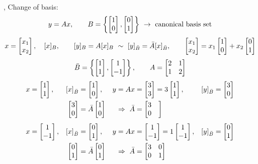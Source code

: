 \sep
\point Change of basis:
\[
y=Ax,\qquad B=\left\{\begin{bmatrix}1\\0\end{bmatrix},\begin{bmatrix}0\\1\end{bmatrix}\right\}\ \to\ \text{canonical basis set}
\]
\[
x=\begin{bmatrix}x_1\\x_2\end{bmatrix},\quad [x]_B,\qquad [y]_B=A[x]_B\ \sim\ [y]_{\bar{B}}=\bar{A}[x]_{\bar{B}},
\qquad
\begin{bmatrix}x_1\\x_2\end{bmatrix}=x_1\begin{bmatrix}1\\0\end{bmatrix}+x_2\begin{bmatrix}0\\1\end{bmatrix}
\]
\[
\bar{B}=\left\{\begin{bmatrix}1\\1\end{bmatrix},\begin{bmatrix}1\\-1\end{bmatrix}\right\},\qquad A=\begin{bmatrix}2&1\\1&2\end{bmatrix}
\]
\begin{align*}
x&=\bmat{1\\1}, & [x]_{\bar{B}}&=\bmat{1\\0}, & y=Ax&=\bmat{3\\3}=3\bmat{1\\1}, & [y]_{\bar{B}}&=\bmat{3\\0}\\
&& \bmat{3\\0}&=\bar{A}\bmat{1\\0} & \Rightarrow\ \bar{A}&=\bmat{3&\\0&}\\[4pt]
x&=\bmat{1\\-1}, & [x]_{\bar{B}}&=\bmat{0\\1}, & y=Ax&=\bmat{1\\-1}=1\bmat{1\\-1}, & [y]_{\bar{B}}&=\bmat{0\\1}\\
&& \bmat{0\\1}&=\bar{A}\bmat{0\\1} & \Rightarrow\ \bar{A}&=\bmat{3&0\\0&1}
\end{align*}

